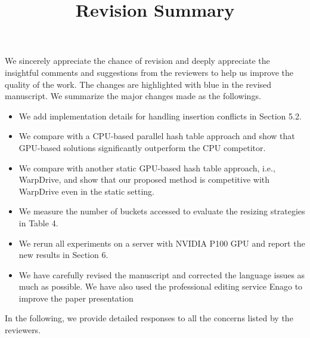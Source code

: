 \documentclass[11pt]{article}
\begin{document}
\title{Revision Summary}
\date{}
\maketitle


\noindent We sincerely appreciate the chance of revision and deeply appreciate the insightful comments and suggestions from the reviewers to help us improve the quality of the work. The changes are highlighted with blue in the revised manuscript. We summarize the major changes made as the followings. 
\begin{itemize}
	\item We add implementation details for handling insertion conflicts in Section 5.2.
	\item We compare with a CPU-based parallel hash table approach and show that GPU-based solutions significantly outperform the CPU competitor. 
	\item We compare with another static GPU-based hash table approach, i.e., WarpDrive, and show that our proposed method is competitive with WarpDrive even in the static setting. 
	\item We measure the number of buckets accessed to evaluate the resizing strategies in Table 4.
	\item We rerun all experiments on a server with NVIDIA P100 GPU and report the new results in Section 6.
	\item We have carefully revised the manuscript and corrected the language issues as much as possible. We have also used the professional editing service Enago to improve the paper presentation
\end{itemize}
%
In the following, we provide detailed responses to all the concerns listed by the reviewers.







%


\end{document}
